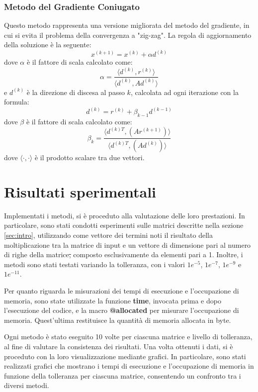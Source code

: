 \subsubsection{Metodo del Gradiente Coniugato}
Questo metodo rappresenta una versione migliorata del metodo del gradiente, in
cui si evita il problema della convergenza a "zig-zag". La regola di aggiornamento
della soluzione è la seguente:
\begin{equation}
    x^{(k+1)} = x^{(k)} + \alpha d^{(k)}
\end{equation}
dove $\alpha$ è il fattore di scala calcolato come:
\begin{equation}
    \alpha = \frac{\langle d^{(k)}, r^{(k)}\rangle}{\langle d^{(k)}, Ad^{(k)}\rangle}
\end{equation}
e $d^{(k)}$ è la direzione di discesa al passo $k$, calcolata ad ogni iterazione
con la formula:
\begin{equation}
    d^{(k)} = r^{(k)} + \beta_{k-1} d^{(k-1)}
\end{equation}
dove $\beta$ è il fattore di scala calcolato come:
\begin{equation}
    \beta_k = \frac{\langle d^{(k)T}, (Ar^{(k + 1)})\rangle}{\langle d^{(k)T}, (Ad^{(k)})\rangle}
\end{equation}
dove $\langle \cdot, \cdot \rangle$ è il prodotto scalare tra due vettori.

\section{Risultati sperimentali}
Implementati i metodi, si è proceduto alla valutazione delle loro prestazioni.
In particolare, sono stati condotti esperimenti sulle matrici descritte nella
sezione \ref{sec:intro}, utilizzando come vettore dei termini noti il risultato
della moltiplicazione tra la matrice di input e un vettore di dimensione pari al
numero di righe della matrice\st{,} composto esclusivamente da elementi pari a 1.
Inoltre, i metodi sono stati testati variando la tolleranza, con i valori $1e^{-5}$,
$1e^{-7}$, $1e^{-9}$ e $1e^{-11}$.

Per quanto riguarda le misurazioni dei tempi di esecuzione e l'occupazione di
memoria, sono state utilizzate la funzione \textbf{time}, invocata prima e dopo
l'esecuzione del codice, e la macro \textbf{@allocated} per misurare l'occupazione
di memoria. Quest'ultima restituisce la quantità di memoria allocata in byte.

Ogni metodo è stato eseguito 10 volte per ciascuna matrice e livello di tolleranza,
al fine di valutare la consistenza dei risultati. Una volta ottenuti i dati, si è
proceduto con la loro visualizzazione mediante grafici. In particolare, sono stati
realizzati grafici che mostrano i tempi di esecuzione e l'occupazione di memoria
in funzione della tolleranza per ciascuna matrice, consentendo un confronto tra
i diversi metodi.

